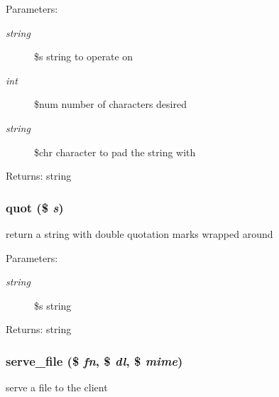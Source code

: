 \begin{Desc}
\item[Parameters:]
\begin{description}
\item[{\em string}]\$s string to operate on \item[{\em int}]\$num number of characters desired \item[{\em string}]\$chr character to pad the string with \end{description}
\end{Desc}
\begin{Desc}
\item[Returns:]string \end{Desc}
\hypertarget{util_8inc_8php_3c7d87c658499c1559a6b98cac06f58d}{
\subsubsection[{quot}]{\setlength{\rightskip}{0pt plus 5cm}quot (\$ {\em s})}}
\label{util_8inc_8php_3c7d87c658499c1559a6b98cac06f58d}


return a string with double quotation marks wrapped around

\begin{Desc}
\item[Parameters:]
\begin{description}
\item[{\em string}]\$s string \end{description}
\end{Desc}
\begin{Desc}
\item[Returns:]string \end{Desc}
\hypertarget{util_8inc_8php_9d3ab20fc8b79fb6ab860f93600c745e}{
\subsubsection[{serve\_\-file}]{\setlength{\rightskip}{0pt plus 5cm}serve\_\-file (\$ {\em fn}, \/  \$ {\em dl}, \/  \$ {\em mime})}}
\label{util_8inc_8php_9d3ab20fc8b79fb6ab860f93600c745e}


serve a file to the client

